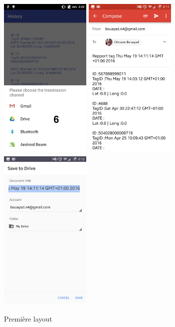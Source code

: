 \documentclass[11pt, a4paper, twoside]{book}
\begin{document}
 \begin{figure}[H]
\centering
\includegraphics[width=4.4cm,height=8cm]{sharemenu}
\includegraphics[width=4.4cm,height=8cm]{gmail}
\includegraphics[width=4.4cm,height=8cm]{drive}
\caption{Première layout}
\end{figure}
\end{document}
